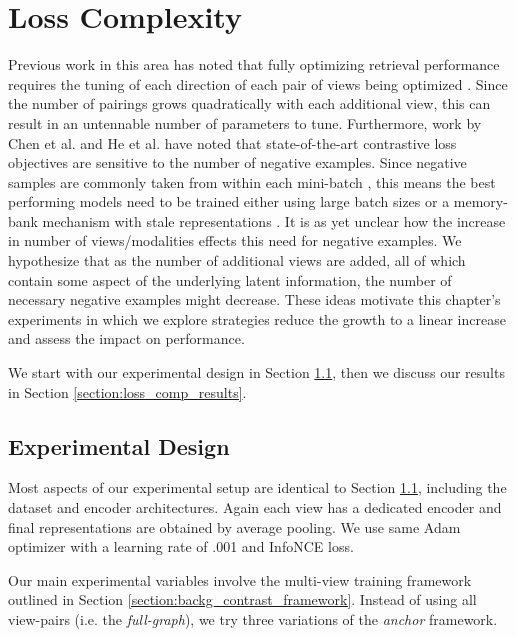 \chapter{Loss Complexity}

Previous work in this area has noted that fully optimizing retrieval performance requires the tuning of each direction of each pair of views being optimized .
Since the number of pairings grows quadratically with each additional view, this can result in an untennable number of parameters to tune.
Furthermore, work by Chen et al. \cite{chen2020simple} and He et al. \cite{he2020momentum} have noted that state-of-the-art contrastive loss objectives are sensitive to the number of negative examples.
Since negative samples are commonly taken from within each mini-batch \cite{oord2018representation, ilharco2019large}, this means the best performing models need to be trained either using large batch sizes or a memory-bank mechanism with stale representations \cite{he2020momentum} .
It is as yet unclear how the increase in number of views/modalities effects this need for negative examples.
We hypothesize that as the number of additional views are added, all of which contain some aspect of the underlying latent information, the number of necessary negative examples might decrease.
These ideas motivate this chapter's experiments in which we explore strategies reduce the growth to a linear increase and assess the impact on performance.

We start with our experimental design in Section \ref{section:loss_comp_exp_design}, then we discuss our results in Section \ref{section:loss_comp_results}.

\section{Experimental Design}
\label{section:loss_comp_exp_design}
Most aspects of our experimental setup are identical to Section \ref{section:loss_comp_exp_design}, including the dataset and encoder architectures.
Again each view has a dedicated encoder and final representations are obtained by average pooling.
We use same Adam optimizer with a learning rate of .001 and InfoNCE loss.

Our main experimental variables involve the multi-view training framework outlined in Section \ref{section:backg_contrast_framework}.
Instead of using all view-pairs (i.e. the \textit{full-graph}), we try three variations of the \textit{anchor} framework.

